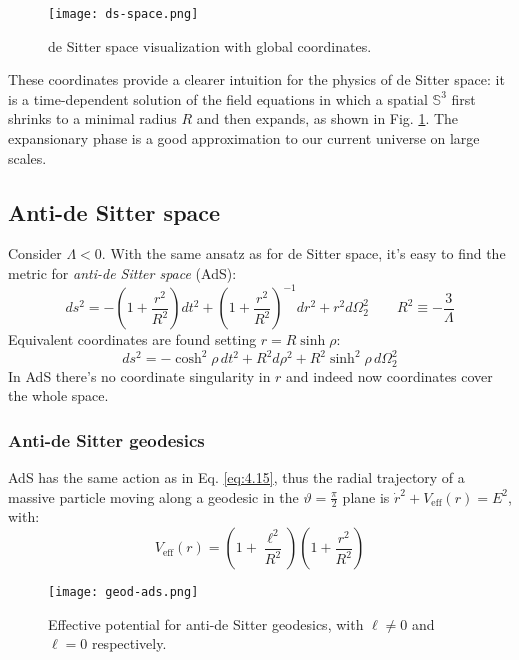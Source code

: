 \begin{figure}
  \centering
  \texttt{[image: ds-space.png]}
  \caption{de Sitter space visualization with global coordinates.}
  \label{ds-space}
\end{figure}

These coordinates provide a clearer intuition for the physics of de Sitter space: it is a time-dependent solution of the field equations in which a spatial $ \mathbb{S}^3 $ first shrinks to a minimal radius $ R $ and then expands, as shown in Fig. \ref{ds-space}. The expansionary phase is a good approximation to our current universe on large scales.

\subsection{Anti-de Sitter space}

Consider $ \Lambda < 0 $. With the same ansatz as for de Sitter space, it's easy to find the metric for \textit{anti-de Sitter space} (AdS):
\begin{equation}
  ds^2 = - \left( 1 + \frac{r^2}{R^2} \right) dt^2 + \left( 1 + \frac{r^2}{R^2} \right)^{-1} dr^2 + r^2 d\Omega_2^2
  \qquad
  R^2 \equiv - \frac{3}{\Lambda}
  \label{eq:4.23}
\end{equation}
Equivalent coordinates are found setting $ r = R \sinh \rho $:
\begin{equation}
  ds^2 = - \cosh^2 \rho\, dt^2 + R^2 d\rho^2 + R^2 \sinh^2 \rho\, d\Omega_2^2
  \label{eq:4.24}
\end{equation}
In AdS there's no coordinate singularity in $ r $ and indeed now coordinates cover the whole space.

\subsubsection{Anti-de Sitter geodesics}

AdS has the same action as in Eq. \ref{eq:4.15}, thus the radial trajectory of a massive particle moving along a geodesic in the $ \vartheta = \frac{\pi}{2} $ plane is $ \dot{r}^2 + V_{\text{eff}}(r) = E^2 $, with:
\begin{equation}
  V_{\text{eff}}(r) = \left( 1 + \frac{\ell^2}{R^2} \right) \left( 1 + \frac{r^2}{R^2} \right)
  \label{eq:4.25}
\end{equation}

\begin{figure}
  \centering
  \texttt{[image: geod-ads.png]}
  \caption{Effective potential for anti-de Sitter geodesics, with $ \ell \neq 0 $ and $ \ell = 0 $ respectively.}
  \label{geo-ads}
\end{figure}

